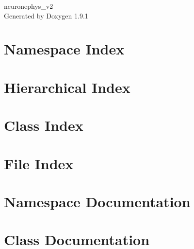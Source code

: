 \let\mypdfximage\pdfximage\def\pdfximage{\immediate\mypdfximage}\documentclass[twoside]{book}
\newcommand{\+}{\discretionary{\mbox{\scriptsize$\hookleftarrow$}}{}{}}
\newcommand{\clearemptydoublepage}{%
  \newpage{\pagestyle{empty}\cleardoublepage}%
}
\begin{document}
\raggedbottom

\begin{titlepage}
\vspace*{7cm}
\begin{center}%
{\Large neuronephys\+\_\+v2 }\\
\vspace*{1cm}
{\large Generated by Doxygen 1.9.1}\\
\end{center}
\end{titlepage}
\clearemptydoublepage
{}
\tableofcontents
\clearemptydoublepage
{}

\chapter{Namespace Index}

\chapter{Hierarchical Index}

\chapter{Class Index}

\chapter{File Index}

\chapter{Namespace Documentation}




\chapter{Class Documentation}





















\end{document}

